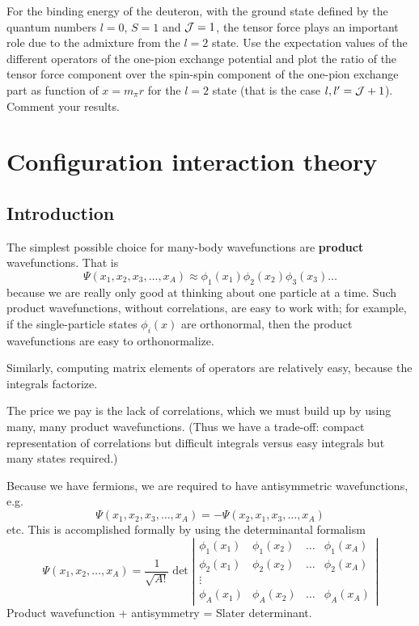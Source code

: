 \documentclass[graybox,sectrefs,envcountresetchap,open=right]{svmonodo}
\newenvironment{doconceexercise}{}{}
\begin{document}
\begin{doconceexercise}
For the binding energy of the deuteron, with the ground state defined by the quantum numbers $l=0$, $S=1$ and ${\cal J}=1$, the tensor force plays an important role due to the admixture from the $l=2$ state. Use the expectation values of the different operators of the one-pion exchange potential and plot the ratio of the tensor force component over the spin-spin component of the one-pion exchange part as function of $x=m_\pi r$ for the $l=2$ state (that is the case $l,l'={\cal J}+1$). Comment your results.





\end{doconceexercise}


\chapter{Configuration interaction theory}
\label{ch:fci}

\section{Introduction}

The simplest possible choice for many-body wavefunctions are \textbf{product} wavefunctions.
That is
\[ 
\Psi(x_1, x_2, x_3, \ldots, x_A) \approx \phi_1(x_1) \phi_2(x_2) \phi_3(x_3) \ldots
\]
because we are really only good  at thinking about one particle at a time. Such 
product wavefunctions, without correlations, are easy to 
work with; for example, if the single-particle states $\phi_i(x)$ are orthonormal, then 
the product wavefunctions are easy to orthonormalize.   

Similarly, computing matrix elements of operators are relatively easy, because the 
integrals factorize.


The price we pay is the lack of correlations, which we must build up by using many, many product 
wavefunctions. (Thus we have a trade-off: compact representation of correlations but 
difficult integrals versus easy integrals but many states required.) 


Because we have fermions, we are required to have antisymmetric wavefunctions, e.g.
\[
\Psi(x_1, x_2, x_3, \ldots, x_A) = - \Psi(x_2, x_1, x_3, \ldots, x_A)
\]
etc. This is accomplished formally by using the determinantal formalism
\[
\Psi(x_1, x_2, \ldots, x_A) 
= \frac{1}{\sqrt{A!}} 
\det \left | 
\begin{array}{cccc}
\phi_1(x_1) & \phi_1(x_2) & \ldots & \phi_1(x_A) \\
\phi_2(x_1) & \phi_2(x_2) & \ldots & \phi_2(x_A) \\
 \vdots & & &  \\
\phi_A(x_1) & \phi_A(x_2) & \ldots & \phi_A(x_A) 
\end{array}
\right |
\]
Product wavefunction + antisymmetry = Slater determinant. 
\end{document}
